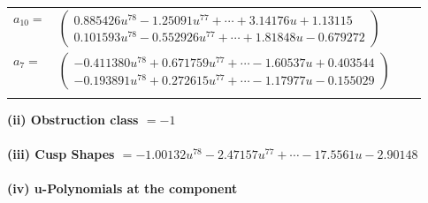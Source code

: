 \documentclass[1p]{elsarticle_modified}
\theoremstyle{definition}
\begin{document}
\begin{tabular}{m{7pt} m{180pt} m{7pt} m{180pt} }
\flushright $a_{10}=$&$\begin{pmatrix}0.885426 u^{78}-1.25091 u^{77}+\cdots+3.14176 u+1.13115\\0.101593 u^{78}-0.552926 u^{77}+\cdots+1.81848 u-0.679272\end{pmatrix}$ \\
\flushright $a_{7}=$&$\begin{pmatrix}-0.411380 u^{78}+0.671759 u^{77}+\cdots-1.60537 u+0.403544\\-0.193891 u^{78}+0.272615 u^{77}+\cdots-1.17977 u-0.155029\end{pmatrix}$\\&\end{tabular}
\flushleft \textbf{(ii) Obstruction class $= -1$}\\~\\
\flushleft \textbf{(iii) Cusp Shapes $= -1.00132 u^{78}-2.47157 u^{77}+\cdots-17.5561 u-2.90148$}\\~\\
\newpage\renewcommand{\arraystretch}{1}
\flushleft \textbf{(iv) u-Polynomials at the component}\newline \\
\end{document}
